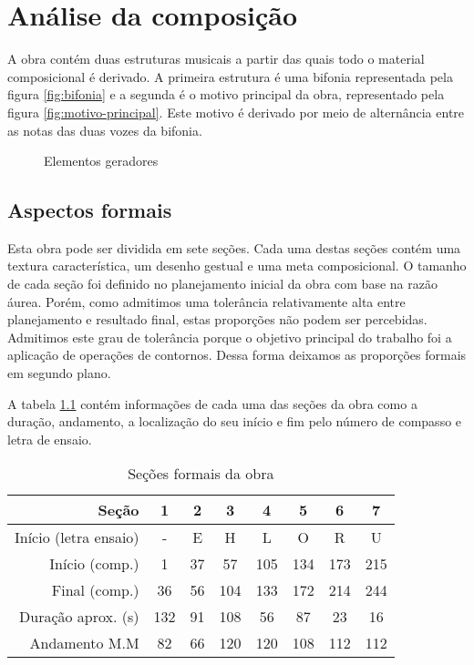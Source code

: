 \chapter{Análise da composição}
\label{cha:anal-da-comp}

A obra contém duas estruturas musicais a partir das quais todo o
material composicional é derivado. A primeira estrutura é uma bifonia
representada pela figura \ref{fig:bifonia} e a segunda é o motivo
principal da obra, representado pela figura
\ref{fig:motivo-principal}. Este motivo é derivado por meio de
alternância entre as notas das duas vozes da bifonia.

\begin{figure}
  \centering
  \caption{Elementos geradores}
  \label{fig:elementos-geradores}
\end{figure}

\section{Aspectos formais}
\label{sec:aspectos-formais}

Esta obra pode ser dividida em sete seções. Cada uma destas seções
contém uma textura característica, um desenho gestual e uma meta
composicional. O tamanho de cada seção foi definido no planejamento
inicial da obra com base na razão áurea. Porém, como admitimos uma
tolerância relativamente alta entre planejamento e resultado final,
estas proporções não podem ser percebidas. Admitimos este grau de
tolerância porque o objetivo principal do trabalho foi a aplicação de
operações de contornos. Dessa forma deixamos as proporções formais em
segundo plano.

A tabela \ref{tab:secoes-obra} contém informações de cada uma das
seções da obra como a duração, andamento, a localização do seu início
e fim pelo número de compasso e letra de ensaio.

\begin{table}
  \centering
  \begin{tabular}{r|ccccccc}
    Seção & 1 & 2 & 3 & 4 & 5 & 6 & 7 \\
    \hline
    Início (letra ensaio) & - & E & H & L & O & R & U \\
    Início (comp.) & 1 & 37 & 57 & 105 & 134 & 173 & 215 \\
    Final (comp.) & 36 & 56 & 104 & 133 & 172 & 214 & 244 \\
    Duração aprox. (s) & 132 & 91 & 108 & 56 & 87 & 23 & 16\\
    Andamento M.M & 82 & 66 & 120 & 120 & 108 & 112 & 112 \\
  \end{tabular}
  \caption{Seções formais da obra}
  \label{tab:secoes-obra}
\end{table}

